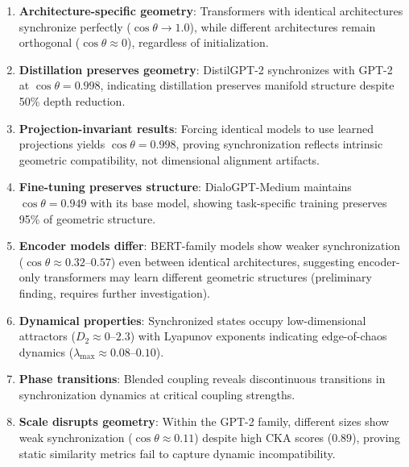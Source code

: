 \documentclass[10pt]{article} %
\theoremstyle{plain}
\theoremstyle{definition}
\theoremstyle{remark}
\begin{document}
\begin{enumerate}
    \item \textbf{Architecture-specific geometry}: Transformers with identical architectures synchronize perfectly ($\cos \theta \to 1.0$), while different architectures remain orthogonal ($\cos \theta \approx 0$), regardless of initialization.

    \item \textbf{Distillation preserves geometry}: DistilGPT-2 synchronizes with GPT-2 at $\cos \theta = 0.998$, indicating distillation preserves manifold structure despite 50\% depth reduction.

    \item \textbf{Projection-invariant results}: Forcing identical models to use learned projections yields $\cos \theta = 0.998$, proving synchronization reflects intrinsic geometric compatibility, not dimensional alignment artifacts.

    \item \textbf{Fine-tuning preserves structure}: DialoGPT-Medium maintains $\cos \theta = 0.949$ with its base model, showing task-specific training preserves 95\% of geometric structure.

    \item \textbf{Encoder models differ}: BERT-family models show weaker synchronization ($\cos \theta \approx 0.32$--$0.57$) even between identical architectures, suggesting encoder-only transformers may learn different geometric structures (preliminary finding, requires further investigation).

    \item \textbf{Dynamical properties}: Synchronized states occupy low-dimensional attractors ($D_2 \approx 0$--$2.3$) with Lyapunov exponents indicating edge-of-chaos dynamics ($\lambda_{\max} \approx 0.08$--$0.10$).

    \item \textbf{Phase transitions}: Blended coupling reveals discontinuous transitions in synchronization dynamics at critical coupling strengths.

    \item \textbf{Scale disrupts geometry}: Within the GPT-2 family, different sizes show weak synchronization ($\cos \theta \approx 0.11$) despite high CKA scores ($0.89$), proving static similarity metrics fail to capture dynamic incompatibility.
\end{enumerate}

\end{document}
